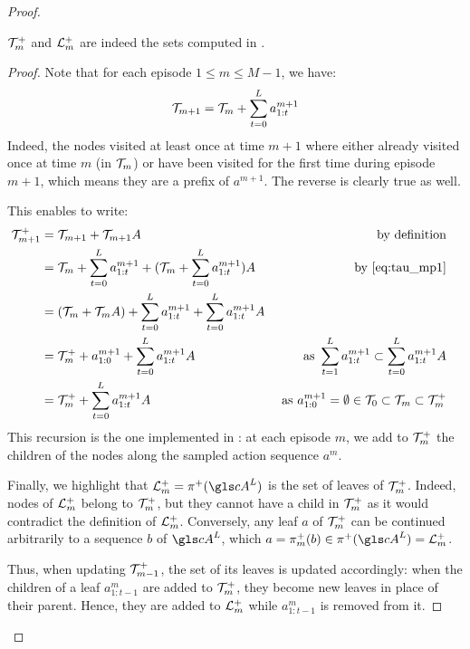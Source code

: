 \begin{proof}
	\begin{lemma}
		\begin{leftbar}[lemmabar]
		$\mathcal{T}_m^+$ and $\mathcal{L}_m^+$ are indeed the sets computed in .
		\end{leftbar}
	\end{lemma}
	\begin{proof}
		Note that for each episode $1 \leq m \leq M - 1$, we have:
		\begin{equation}
		\label{eq:tau_mp1}
		\mathcal{T}_{m+1} = \mathcal{T}_{m} + \sum_{t=0}^L a^{m+1}_{1:t}
		\end{equation}
		Indeed, the nodes visited at least once at time $m+1$ where either already visited once at time $m$ (\eg in $\mathcal{T}_{m}$) or have been visited for the first time during episode $m+1$, which means they are a prefix of $a^{m+1}$. The reverse is clearly true as well.
		
		This enables to write:
		\begin{align*}
		\mathcal{T}_{m+1}^+ &= \mathcal{T}_{m+1} + \mathcal{T}_{m+1}A & \text{by definition}\\
		&= \mathcal{T}_{m} + \sum_{t=0}^L a^{m+1}_{1:t} + (\mathcal{T}_{m} + \sum_{t=0}^L a^{m+1}_{1:t})A & \text{by \eqref{eq:tau_mp1}} & \\
		&= (\mathcal{T}_{m} + \mathcal{T}_{m}A) + \sum_{t=0}^L a^{m+1}_{1:t} + \sum_{t=0}^L a^{m+1}_{1:t}A & \\
		&= \mathcal{T}_{m}^+ + a^{m+1}_{1:0} + \sum_{t=0}^L a^{m+1}_{1:t}A &\text{ as } \sum_{t=1}^L a^{m+1}_{1:t} \subset \sum_{t=0}^L a^{m+1}_{1:t}A\\
		&=  \mathcal{T}_{m}^+ + \sum_{t=0}^L a^{m+1}_{1:t}A  &\text{ as }a^{m+1}_{1:0}=\emptyset \in \mathcal{T}_{0} \subset \mathcal{T}_{m} \subset \mathcal{T}_m^+
		\end{align*}
		This recursion is the one implemented in : at each episode $m$, we add to $\mathcal{T}_{m}^+$ the children of the nodes along the sampled action sequence $a^{m}$.
		
		Finally, we highlight that $\LL_m^+ = \pi^+(\cA^L)$ is the set of leaves of $\mathcal{T}_{m}^+$.
		Indeed, nodes of $\mathcal{L}_m^+$ belong to $\mathcal{T}_{m}^+$, but they cannot have a child in $\mathcal{T}_{m}^+$ as it would contradict the definition of $\mathcal{L}_m^+$. Conversely, any leaf $a$ of $\mathcal{T}_{m}^+$ can be continued arbitrarily to a sequence $b$ of $\cA^L$, which  $a = \pi_m^+(b) \in \pi^+(\cA^L) = \LL_m^+$.
		
		Thus, when updating $\mathcal{T}_{m-1}^+$, the set of its leaves is updated accordingly: when the children of a leaf $a^m_{1:t-1}$ are added to $\mathcal{T}_m^+$, they become new leaves in place of their parent. Hence, they are added to $\mathcal{L}_m^+$ while $a^m_{1:t-1}$ is removed from it.
	\end{proof}
	

\end{proof}
